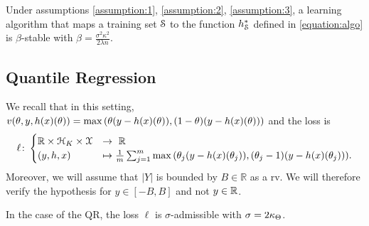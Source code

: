 \begin{proposition} \citep{kadri2016operator} \label{proposition:kadri}
Under assumptions
\ref{assumption:1}, \ref{assumption:2}, \ref{assumption:3}, a learning algorithm
that maps a training set $\mathcal{S}$ to the function $h^{*}_{\mathcal{S}}$ defined in
\cref{equation:algo} is $\beta$-stable with $\beta =
\frac{\sigma^2 \kappa^2}{2 \lambda n }$.
\end{proposition}

\subsection{Quantile Regression}
We recall that in this setting, $\hcost(\hyperparameter,y,h(x)(\hyperparameter)) =
\max{(\hyperparameter(y-h(x)(\hyperparameter)),(1-\hyperparameter)(y-h(x)(\hyperparameter)))}$
and the loss is
\begin{dmath}
  \ell \colon
  \begin{cases}
      \reals \times \mcH_K \times \mcX &\to ~ \mathbb{R}      \\
      (y,h,x)  & \mapsto \frac{1}{m} \sum_{j=1}^m \max{(\theta_j(y-h(x)(\theta_j)),(\theta_j-1)(y-h(x)(\theta_j)))}.
  \end{cases}
\end{dmath}
Moreover, we will assume that $|Y|$ is bounded by $B \in \mathbb{R}$ as a \ac{rv}. We will
therefore verify the hypothesis for $y \in [-B,B]$ and not $y \in \mathbb{R}$.
\begin{lemma} \label{lemma:admissibility_qr}
  In the case of the \ac{QR}, the loss $\ell$ is $\sigma$-admissible
  with $\sigma = 2 \kappa_{\Theta}$.
\end{lemma}
